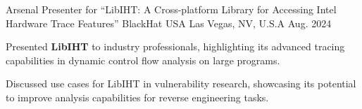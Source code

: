 

\begin{cventries}

  \cventry
    {Arsenal Presenter for ``LibIHT: A Cross-platform Library for Accessing Intel Hardware Trace Features''} %
    {BlackHat USA} %
    {Las Vegas, NV, U.S.A} %
    {Aug. 2024} %
    {
      \begin{cvitems} %
        \item {Presented \textbf{LibIHT} to industry professionals, highlighting its advanced tracing capabilities in dynamic control flow analysis on large programs.}
        \item {Discussed use cases for LibIHT in vulnerability research, showcasing its potential to improve analysis capabilities for reverse engineering tasks.}
      \end{cvitems}
    }

\end{cventries}
